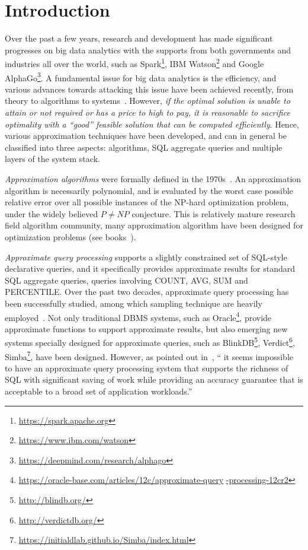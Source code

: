 \section{Introduction}
\label{sec-intro}


Over the past a few years, research and development has made significant progresses on big data analytics with the supports from both governments and industries all over the world, such as Spark\footnote{\small \url{https://spark.apache.org}}, IBM Watson\footnote{\small \url{https://www.ibm.com/watson}} and Google AlphaGo\footnote{\small \url{https://deepmind.com/research/alphago}}. A fundamental issue for big data analytics is the efficiency, and various advances towards attacking this issue have been achieved recently, from theory to algorithms to systems~\cite{FanGN13,Jordan15,ZahariaXWDADMRV16}. However, {\em if the optimal solution is unable to attain or not required or has a price to high to pay, it is reasonable to sacrifice optimality with a ``good'' feasible solution that can be computed efficiently}. Hence, various approximation techniques have been developed, and can in general be classified into three aspects: algorithms, SQL aggregate queries and multiple layers of the system stack.

\bi
\item[(1)] {\em Approximation algorithms} were formally defined in the 1970s~\cite{GareyGU72,Johnson74a}. An approximation algorithm is necessarily polynomial, and is evaluated by the worst case possible relative error over all possible instances of the  NP-hard optimization problem, under the widely believed $P\ne NP$ conjecture. This is relatively mature research field algorithm community, many approximation algorithm have been designed for optimization problems (see books~\cite{Dorit96,approx03,Ausiello99}).
\item[(2)] {\em Approximate query processing} supports a slightly constrained set of SQL-style declarative queries, and it specifically provides approximate results for standard SQL aggregate queries, \eg queries involving COUNT, AVG, SUM and PERCENTILE. Over the past two decades, approximate query processing has been successfully studied, among which sampling technique are heavily employed~\cite{ChaudhuriDK17,Mozafari17,Kraska17,GarofalakisG01}. Not only traditional DBMS systems, such as Oracle\footnote{\small \url{https://oracle-base.com/articles/12c/approximate-query} \url{-processing-12cr2}},  provide approximate functions to support approximate results, but also emerging new systems specially designed for approximate queries, such as BlinkDB\footnote{\small \url{http://blindb.org/}}, Verdict\footnote{\small \url{http://verdictdb.org/}}, Simba\footnote{\small \url{https://initialdlab.github.io/Simba/index.html}}, have been designed. However, as pointed out in~\cite{ChaudhuriDK17}, `` it seems impossible to have an approximate query processing system that supports the richness of SQL with significant saving of work while providing an accuracy guarantee that is acceptable to a broad set of application workloads.''

